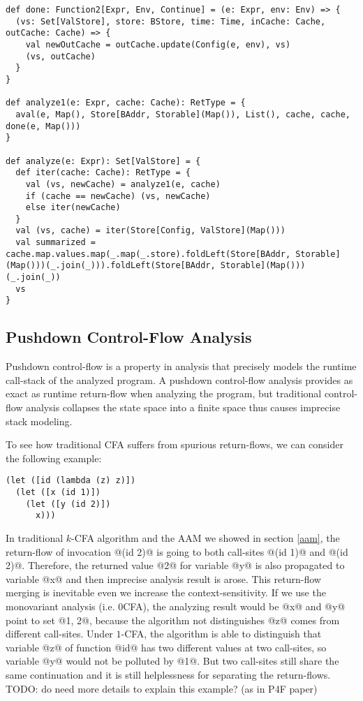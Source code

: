 \documentclass[acmsmall,review,anonymous]{acmart}\settopmatter{printfolios=true,printccs=false,printacmref=false}
\begin{document}
\begin{lstlisting}
def done: Function2[Expr, Env, Continue] = (e: Expr, env: Env) => {
  (vs: Set[ValStore], store: BStore, time: Time, inCache: Cache, outCache: Cache) => {
    val newOutCache = outCache.update(Config(e, env), vs)
    (vs, outCache)
  }
}

def analyze1(e: Expr, cache: Cache): RetType = {
  aval(e, Map(), Store[BAddr, Storable](Map()), List(), cache, cache, done(e, Map()))
}

def analyze(e: Expr): Set[ValStore] = {
  def iter(cache: Cache): RetType = {
    val (vs, newCache) = analyze1(e, cache)
    if (cache == newCache) (vs, newCache)
    else iter(newCache)
  }
  val (vs, cache) = iter(Store[Config, ValStore](Map()))
  val summarized = cache.map.values.map(_.map(_.store).foldLeft(Store[BAddr, Storable](Map()))(_.join(_))).foldLeft(Store[BAddr, Storable](Map()))(_.join(_))
  vs
}
\end{lstlisting}

\subsection{Pushdown Control-Flow Analysis}

Pushdown control-flow is a property in analysis that precisely models
the runtime call-stack of the analyzed program. 
A pushdown control-flow analysis provides as exact as runtime return-flow 
when analyzing the program, but traditional control-flow analysis collapses 
the state space into a finite space thus causes imprecise stack modeling.

To see how traditional CFA suffers from spurious return-flows, 
we can consider the following example:

\begin{lstlisting}
(let ([id (lambda (z) z)])
  (let ([x (id 1)])
    (let ([y (id 2)])
      x)))
\end{lstlisting}

In traditional $k$-CFA algorithm and the AAM we showed in section \ref{aam}, 
the return-flow of invocation @(id 2)@
is going to both call-sites @(id 1)@ and @(id 2)@. Therefore, the
returned value @2@ for variable @y@ is also propagated to 
variable @x@ and then imprecise analysis result is arose.
This return-flow merging is inevitable even we increase the context-sensitivity.
If we use the monovariant analysis (i.e. 0CFA), the analyzing result would be @x@ and 
@y@ point to set @{1, 2}@, because the algorithm not distinguishes
@z@ comes from different call-sites.
Under $1$-CFA, the algorithm is able to distinguish that variable @z@ of function
@id@ has two different values at two call-sites, so variable @y@ 
would not be polluted by @1@. 
But two call-sites still share the same continuation and
it is still helplessness for separating the return-flows.
TODO: do need more details to explain this example? (as in P4F paper)
\end{document}
